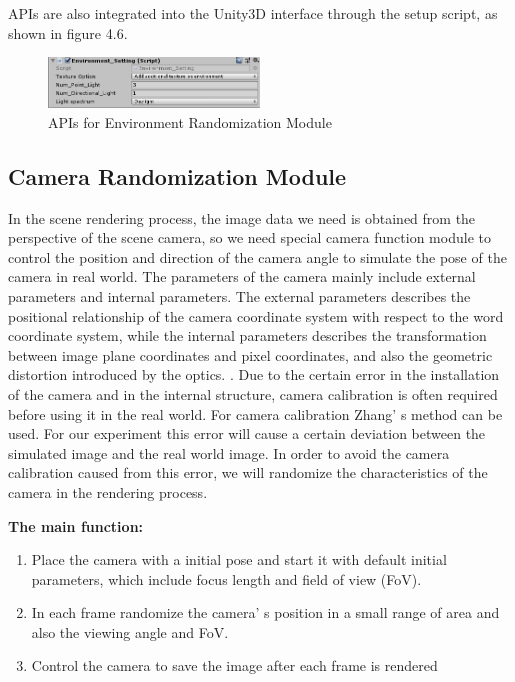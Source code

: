 APIs are also integrated into the Unity3D interface through the setup script, as shown in figure 4.6.
\begin{figure}[h]
	\includegraphics[width=0.5\textwidth]{Figures/Section4_EnvrdApi.png} 
	\centering
	\captionsetup{justification=centering}
	\caption{APIs for Environment Randomization Module}
	\label{fig:envrdApi}
\end{figure}

\subsection{Camera Randomization Module}
In the scene rendering process, the image data we need is obtained from the perspective of the scene camera, so we need special camera function module to control the position and direction of the camera angle to simulate the pose of the camera in real world. The parameters of the camera mainly include external parameters and internal parameters. The external parameters describes the positional relationship of the camera coordinate system with respect to the word coordinate system, while the internal parameters describes the transformation between image plane coordinates and pixel coordinates, and also the geometric distortion introduced by the optics. \cite{zhang2000flexible}. Due to the certain error in the installation of the camera and in the internal structure, camera calibration is often required before using it in the real world. For camera calibration Zhang' s method can be used. For our experiment this error will cause a certain deviation between the simulated image and the real world image. In order to avoid the camera calibration caused from this error, we will randomize the characteristics of the camera in the rendering process.

\textbf{The main function:}
\begin{enumerate}
	\item Place the camera with a initial pose and start it with default initial parameters, which include focus length and field of view (FoV).
	\item In each frame randomize the camera' s position in a small range of area and also the viewing angle and FoV.
	\item Control the camera to save the image after each frame is rendered
\end{enumerate}

